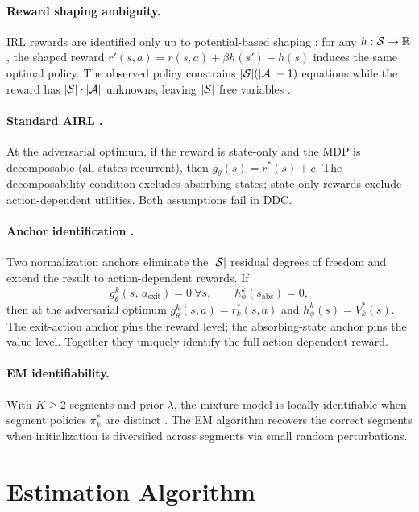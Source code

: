 \documentclass[11pt]{article}
\begin{document}
\paragraph{Reward shaping ambiguity.} IRL rewards are identified only up to potential-based shaping \citep{ng1999}: for any $h : \mathcal{S} \to \mathbb{R}$, the shaped reward $r'(s,a) = r(s,a) + \beta h(s') - h(s)$ induces the same optimal policy. The observed policy constrains $|\mathcal{S}|(|\mathcal{A}|-1)$ equations while the reward has $|\mathcal{S}| \cdot |\mathcal{A}|$ unknowns, leaving $|\mathcal{S}|$ free variables \citep{cao2021}.

\paragraph{Standard AIRL \citep[Theorem~1]{fu2018}.} At the adversarial optimum, if the reward is state-only and the MDP is decomposable (all states recurrent), then $g_\theta(s) = r^*(s) + c$. The decomposability condition excludes absorbing states; state-only rewards exclude action-dependent utilities. Both assumptions fail in DDC.

\paragraph{Anchor identification \citep{lee2026}.} Two normalization anchors eliminate the $|\mathcal{S}|$ residual degrees of freedom and extend the result to action-dependent rewards. If
\begin{equation}
\label{eq:anchors}
g_\theta^k(s,\, a_{\text{exit}}) = 0\ \forall s, \qquad h_\phi^k(s_{\text{abs}}) = 0,
\end{equation}
then at the adversarial optimum $g_\theta^k(s,a) = r^*_k(s,a)$ and $h_\phi^k(s) = V^*_k(s)$. The exit-action anchor pins the reward level; the absorbing-state anchor pins the value level. Together they uniquely identify the full action-dependent reward.

\paragraph{EM identifiability.} With $K \geq 2$ segments and prior $\lambda$, the mixture model is locally identifiable when segment policies $\pi^*_k$ are distinct \citep{yakowitz1968}. The EM algorithm recovers the correct segments when initialization is diversified across segments via small random perturbations.

\section{Estimation Algorithm}
\end{document}
